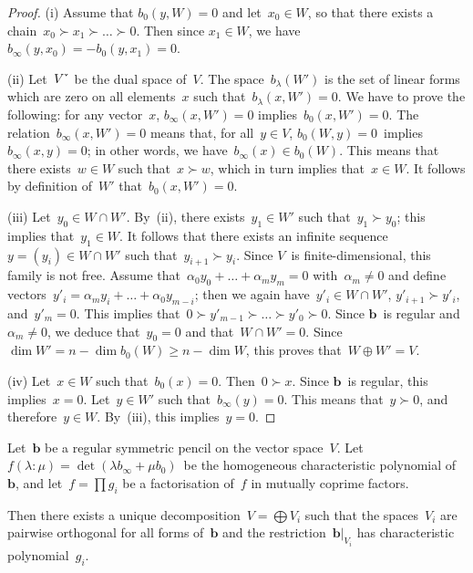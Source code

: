 \documentclass{article}%
\def\chk#1{#1^{\smash{\scalebox{.7}[1.4]{\rotatebox{90}{\guilsinglleft}}}}}
\begin{document}
\begin{proof}
(i) Assume that $b_0(y, W) = 0$ and let~$x_0 ∈ W$,
so that there exists a chain~$x_0 ≻ x_1 ≻ … ≻ 0$.
Then since $x_1 ∈ W$, we have~$b_{∞} (y, x_0) = -b_0 (y, x_1) = 0$.

(ii) Let~$\chk{V}$ be the dual space of~$V$. The space~$b_{λ}(W')$ is the set
of linear forms which are zero on all elements~$x$ such that~$b_{λ} (x,
W') = 0$.
We have to prove the following: for any vector~$x$, $b_{∞}(x, W') =
0$ implies~$b_0 (x, W') = 0$. The relation~$b_{∞} (x, W') = 0$ means
that, for all~$y ∈ V$, $b_0(W, y) = 0$~implies~$b_{∞} (x, y) = 0$; in
other words, we have~$b_{∞} (x) ∈ b_0(W)$. This means that there
exists~$w ∈ W$ such that~$x ≻ w$, which in turn implies that~$x ∈ W$. It
follows by definition of~$W'$ that~$b_0(x, W') = 0$.

(iii) Let~$y_0 ∈ W ∩ W'$. By~(ii), there exists~$y_1 ∈ W'$ such that~$y_1
≻ y_0$; this implies that~$y_1 ∈ W$. It follows that there exists an
infinite sequence~$y = (y_i) ∈ W ∩ W'$ such that~$y_{i+1} ≻ y_i$. Since
$V$~is finite-dimensional, this family is not free. Assume that~$α_0 y_0
+ … + α_m y_m = 0$ with~$α_m ≠ 0$ and define vectors~$y'_i = α_m y_i + …
+ α_0 y_{m-i}$; then we again have~$y'_i ∈ W ∩ W'$, $y'_{i+1} ≻ y'_i$,
and~$y'_m = 0$. This implies that~$0 ≻ y'_{m-1} ≻ … ≻ y'_0 ≻ 0$. Since
$\bm{b}$~is regular and~$α_m ≠ 0$, we deduce that~$y_0 = 0$ and that~$W ∩
W' = 0$. Since $\dim W' = n - \dim b_0(W) ≥ n - \dim W$, this proves
that~$W ⊕ W' = V$.

(iv) Let~$x ∈ W$ such that~$b_0(x) = 0$. Then~$0 ≻ x$. Since $\bm{b}$~is
regular, this implies~$x = 0$. 
Let~$y ∈ W'$ such that~$b_{∞} (y) = 0$. This means that~$y ≻ 0$, and
therefore~$y ∈ W$. By~(iii), this implies~$y = 0$.
\end{proof}%
\begin{lem}\label{lem:decomp-bezout}%
Let~$\bm{b}$ be a regular symmetric pencil on the vector space~$V$.
Let~$f(λ: μ) = \det (λ b_{∞} + μ b_0)$~be the homogeneous characteristic
polynomial of~$\bm{b}$, and let~$f = ∏ g_i$ be a factorisation of~$f$ in
mutually coprime factors.

Then there exists a unique decomposition~$V = ⨁ V_i$ such that the
spaces~$V_i$ are pairwise orthogonal for all forms of~$\bm{b}$ and the
restriction~$\bm{b}|_{V_i}$ has characteristic polynomial~$g_i$.
\end{lem}
\end{document}
